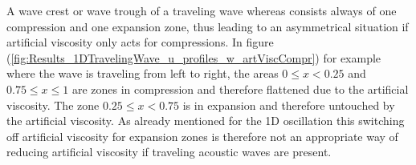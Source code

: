 \documentclass[11pt,a4paper,twoside]{report}
\begin{document}
 A wave crest or wave trough of a traveling wave whereas consists always of one compression and one expansion zone, thus leading to an asymmetrical situation if artificial viscosity only acts for compressions. In figure (\ref{fig:Results_1DTravelingWave_u_profiles_w_artViscCompr}) for example where the wave is traveling from left to right, the areas $0\leq x <0.25$ and $0.75\leq x \leq 1$ are zones in compression and therefore flattened due to the artificial viscosity. The zone $0.25\leq x <0.75$ is in expansion and therefore untouched by the artificial viscosity.
As already mentioned for the 1D oscillation this switching off artificial viscosity for expansion zones is therefore not an appropriate way of reducing artificial viscosity if traveling acoustic waves are present.

\begin{figure}[h]
 \label{fig:Results_1TravelingWave_u_profiles}
\centering
{}
\end{figure}
\end{document}
